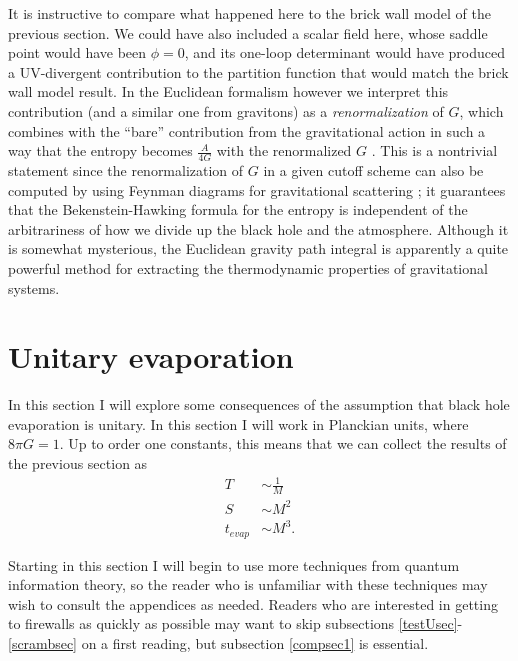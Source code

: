 \documentclass[12pt]{article}
\begin{document}
It is instructive to compare what happened here to the brick wall model of the previous section.  We could have also included a scalar field here, whose saddle point would have been $\phi=0$, and its one-loop determinant would have produced a UV-divergent contribution to the partition function that would match the brick wall model result.  In the Euclidean formalism however we interpret this contribution (and a similar one from gravitons) as a \textit{renormalization} of $G$, which combines with the ``bare'' contribution from the gravitational action in such a way that the entropy becomes $\frac{A}{4G}$ with the renormalized $G$ \cite{Susskind:1994sm,Demers:1995dq}.  This is a nontrivial statement since the renormalization of $G$ in a given cutoff scheme can also be computed by using Feynman diagrams for gravitational scattering \cite{Demers:1995dq}; it guarantees that the Bekenstein-Hawking formula for the entropy is independent of the arbitrariness of how we divide up the black hole and the atmosphere.  Although it is somewhat mysterious, the Euclidean gravity path integral is apparently a quite powerful method for extracting the thermodynamic properties of gravitational systems.  

\section{Unitary evaporation}\label{evapsec}
In this section I will explore some consequences of the assumption that black hole evaporation is unitary.  In this section I will work in Planckian units, where $8\pi G=1$.  Up to order one constants, this means that we can collect the results of the previous section as
\begin{align}
T&\sim\frac{1}{M}\\
S&\sim M^2\\
t_{evap}&\sim M^3.
\end{align}

Starting in this section I will begin to use more techniques from quantum information theory, so the reader who is unfamiliar with these techniques may wish to consult the appendices as needed.  Readers who are interested in getting to firewalls as quickly as possible may want to skip subsections \ref{testUsec}-\ref{scrambsec} on a first reading, but subsection \ref{compsec1} is essential.
\end{document}
